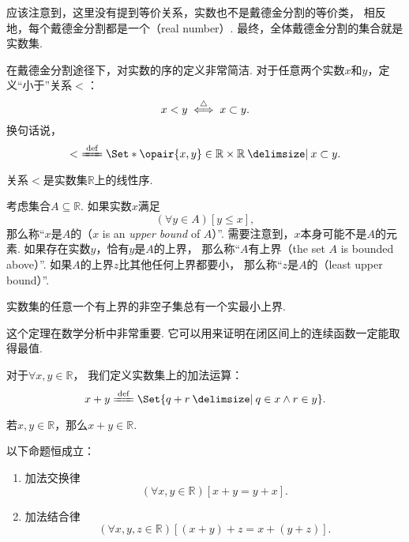 应该注意到，这里没有提到等价关系，实数也不是戴德金分割的等价类，
相反地，每个戴德金分割都是一个（real number）.
最终，全体戴德金分割的集合就是实数集.

在戴德金分割途径下，对实数的序的定义非常简洁.
对于任意两个实数\(x\)和\(y\)，定义“小于”关系\(<\)：\[
	x < y \overset{\triangle}{\iff} x \subset y.
\]
换句话说，\[
	<\ \defeq \Set*{ \opair{x,y}\in\mathbb{R}\times\mathbb{R} \given x \subset y }.
\]

\begin{theorem}
关系\(<\)是实数集\(\mathbb{R}\)上的线性序.
\end{theorem}

考虑集合\(A \subseteq \mathbb{R}\).
如果实数\(x\)满足\[
	(\forall y \in A)[y \leq x],
\]
那么称“\(x\)是\(A\)的（\(x\) is an \emph{upper bound} of \(A\)）”.
需要注意到，\(x\)本身可能不是\(A\)的元素.
如果存在实数\(y\)，恰有\(y\)是\(A\)的上界，
那么称“\(A\)有上界（the set \(A\) is bounded above）”.
如果\(A\)的上界\(z\)比其他任何上界都要小，
那么称“\(z\)是\(A\)的（least upper bound）”.

\begin{theorem}
实数集的任意一个有上界的非空子集总有一个实最小上界.
\end{theorem}
这个定理在数学分析中非常重要.
它可以用来证明在闭区间上的连续函数一定能取得最值.

\begin{definition}
对于\(\forall x,y\in\mathbb{R}\)，
我们定义实数集上的加法运算：
\begin{equation}
	x + y \defeq \Set{
		q + r \given q \in x \land r \in y
	}.
\end{equation}
\end{definition}

\begin{lemma}
若\(x,y\in\mathbb{R}\)，那么\(x+y\in\mathbb{R}\).
\end{lemma}

\begin{theorem}
以下命题恒成立：
\begin{enumerate}
	\item 加法交换律
	\begin{equation}
		(\forall x,y\in\mathbb{R})[x+y=y+x].
	\end{equation}
	\item 加法结合律
	\begin{equation}
		(\forall x,y,z\in\mathbb{R})[(x+y)+z=x+(y+z)].
	\end{equation}
\end{enumerate}
\end{theorem}

